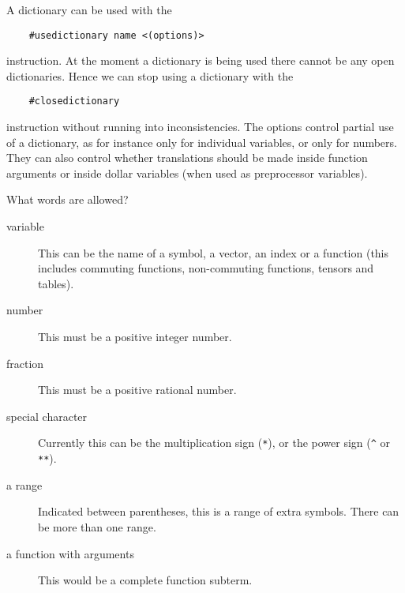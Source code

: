 A dictionary can be used with the
\begin{verbatim}
    #usedictionary name <(options)>
\end{verbatim}
instruction. At the moment a dictionary is being used there cannot be any 
open dictionaries. Hence we can stop using a dictionary with the
\begin{verbatim}
    #closedictionary
\end{verbatim}
instruction without running into inconsistencies. 
The options control partial use of a dictionary, as for instance only for 
individual variables, or only for numbers. They can also control whether 
translations should be made inside function arguments or inside dollar 
variables (when used as preprocessor variables).

What words are allowed?
\begin{description}
\item[variable] This can be the name of a symbol, a vector, an index or a 
function (this includes commuting functions, non-commuting functions, 
tensors and tables).
\item[number] This must be a positive integer number.
\item[fraction] This must be a positive rational number.
\item[special character] Currently this can be the multiplication sign 
(\verb:*:), or the power sign (\verb:^: or \verb:**:).
\item[a range] Indicated between parentheses, this is a range 
of extra symbols. There can be more than one range.
\item[a function with arguments] This would be a complete function subterm. 
\end{description}

